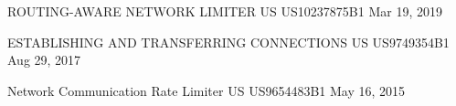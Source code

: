 

\begin{cventries}

  \cventry
    {ROUTING-AWARE NETWORK LIMITER} %
	{US US10237875B1} %
    {Mar 19, 2019} %

  \cventry
    {ESTABLISHING AND TRANSFERRING CONNECTIONS} %
	{US US9749354B1} %
    {Aug 29, 2017} %

  \cventry
    {Network Communication Rate Limiter} %
	{US US9654483B1} %
    {May 16, 2015} %

\end{cventries}

